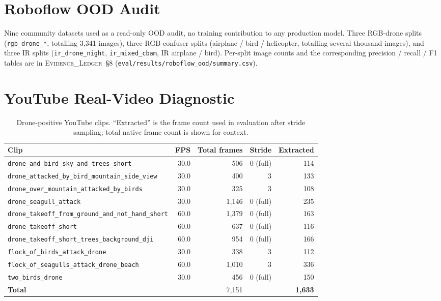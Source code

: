\documentclass[12pt,a4paper,oneside,openright]{book}
\begin{document}
\section{Roboflow OOD Audit}

Nine community datasets used as a read-only OOD audit, no training contribution to any production model. Three RGB-drone splits (\texttt{rgb\_drone\_*}, totalling 3{,}341 images), three RGB-confuser splits (airplane / bird / helicopter, totalling several thousand images), and three IR splits (\texttt{ir\_drone\_night}, \texttt{ir\_mixed\_cbam}, IR airplane / bird). Per-split image counts and the corresponding precision / recall / F1 tables are in \textsc{Evidence\_Ledger}~\S8 (\texttt{eval/results/roboflow\_ood/summary.csv}).

\section{YouTube Real-Video Diagnostic}

\begin{table}[htbp]
    \centering
    \caption{Drone-positive YouTube clips. ``Extracted'' is the frame count used in evaluation after stride sampling; total native frame count is shown for context.}
    \label{tab:youtube_drone_clips}
    \begin{tabular}{lrrrr}
        \toprule
        Clip & FPS & Total frames & Stride & Extracted \\
        \midrule
        \texttt{drone\_and\_bird\_sky\_and\_trees\_short}     & 30.0 &   506 & 0 (full) & 114 \\
        \texttt{drone\_attacked\_by\_bird\_mountain\_side\_view} & 30.0 & 400 & 3 & 133 \\
        \texttt{drone\_over\_mountain\_attacked\_by\_birds}   & 30.0 &   325 & 3 & 108 \\
        \texttt{drone\_seagull\_attack}                        & 30.0 & 1{,}146 & 0 (full) & 235 \\
        \texttt{drone\_takeoff\_from\_ground\_and\_not\_hand\_short} & 60.0 & 1{,}379 & 0 (full) & 163 \\
        \texttt{drone\_takeoff\_short}                         & 60.0 & 637 & 0 (full) & 116 \\
        \texttt{drone\_takeoff\_short\_trees\_background\_dji} & 60.0 & 954 & 0 (full) & 166 \\
        \texttt{flock\_of\_birds\_attack\_drone}              & 30.0 & 338 & 3 & 112 \\
        \texttt{flock\_of\_seagulls\_attack\_drone\_beach}    & 60.0 & 1{,}010 & 3 & 336 \\
        \texttt{two\_birds\_drone}                              & 30.0 & 456 & 0 (full) & 150 \\
        \midrule
        \textbf{Total} & & 7{,}151 & & \textbf{1{,}633} \\
        \bottomrule
    \end{tabular}
\end{table}
\end{document}
